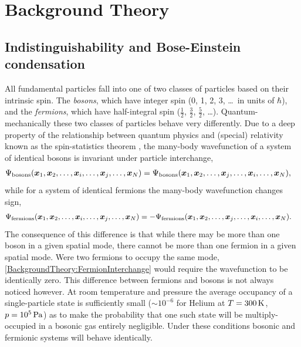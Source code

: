 \chapter{Background Theory}
\label{BackgroundTheory}
\graphicspath{{Figures/BackgroundTheory/}{Figures/Common/}}


\section{Indistinguishability and Bose-Einstein condensation}

All fundamental particles fall into one of two classes of particles based on their intrinsic spin.  The \emph{bosons}, which have integer spin (0, 1, 2, 3, \dots\ in units of $\hbar$), and the \emph{fermions}, which have half-integral spin ($\frac{1}{2}$, $\frac{3}{2}$, $\frac{5}{2}$, \dots).  Quantum-mechanically these two classes of particles behave very differently.  Due to a deep property of the relationship between quantum physics and (special) relativity known as the spin-statistics theorem \citep{Fierz:1939}, the many-body wavefunction of a system of identical bosons is invariant under particle interchange,
\begin{align}
    \Psi_\text{bosons}(\vect{x}_1, \vect{x}_2, \dots, \vect{x}_i, \dots, \vect{x}_j, \dots, \vect{x}_N) &= \Psi_\text{bosons}(\vect{x}_1, \vect{x}_2, \dots, \vect{x}_j, \dots, \vect{x}_i, \dots, \vect{x}_N), \label{BackgroundTheory:BosonInterchange}
\end{align}
while for a system of identical fermions the many-body wavefunction changes sign,
\begin{align}
    \Psi_\text{fermions}(\vect{x}_1, \vect{x}_2, \dots, \vect{x}_i, \dots, \vect{x}_j, \dots, \vect{x}_N) &= -\Psi_\text{fermions}(\vect{x}_1, \vect{x}_2, \dots, \vect{x}_j, \dots, \vect{x}_i, \dots, \vect{x}_N). \label{BackgroundTheory:FermionInterchange}
\end{align}
The consequence of this difference is that while there may be more than one boson in a given spatial mode, there cannot be more than one fermion in a given spatial mode.  Were two fermions to occupy the same mode, \eqref{BackgroundTheory:FermionInterchange} would require the wavefunction to be identically zero.  This difference between fermions and bosons is not always noticed however.  At room temperature and pressure the average occupancy of a single-particle state is sufficiently small ($\sim 10^{-6}$ for Helium at $T=\unit[300]{K}$, $p = \unit[10^5]{Pa}$) as to make the probability that one such state will be multiply-occupied in a bosonic gas entirely negligible.  Under these conditions bosonic and fermionic systems will behave identically.

